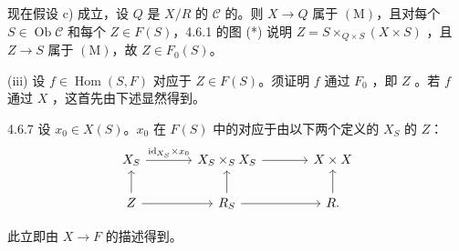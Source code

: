现在假设 c) 成立，设 $Q$ 是 $X/R$ 的 $\mathcal C$ 的。则 $X\to Q$ 属于 $(\mathrm M)$，且对每个 $S\in\operatorname{Ob}\mathcal C$ 和每个 $Z\in F(S)$，4.6.1 的图 (*) 说明 $Z=S\times_{Q\times S}(X\times S)$ ，且 $Z\to S$ 属于 $(\mathrm M)$，故 $Z\in F_0(S)$。

(iii) 设 $f\in\operatorname{Hom}(S,F)$ 对应于 $Z\in F(S)$。须证明 $f$ 通过 $F_0$ ，即 $Z$ 。若 $f$ 通过 $X$ ，这首先由下述显然得到。
\begin{SGAresult}{}{4.6.7}
设 $x_0\in X(S)$。$x_0$ 在 $F(S)$ 中的对应于由以下两个定义的 $X_S$ 的 $Z$：
\[
\begin{tikzcd}[column sep=large]
X_S\arrow[r,"\mathrm{id}_{X_S}\times x_0"]&X_S\times_S X_S\arrow[r]&X\times X\\
Z\arrow[u]\arrow[r]&R_S\arrow[u]\arrow[r]&R\arrow[u].
\end{tikzcd}
\]
\end{SGAresult}
此立即由 $X\to F$ 的描述得到。


